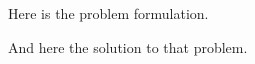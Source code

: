 \begin{problem}[title=A hard problem, pts=20,min=50]
  Here is the problem formulation.
\begin{solution}
    And here the solution to that problem.
\end{solution}
\end{problem}
